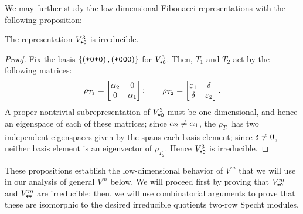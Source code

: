 \documentclass{amsart}
\begin{document}
We may further study the low-dimensional Fibonacci representations with the following proposition:
\begin{proposition}\label{3 irreducibility}
  The representation \emph{$V^3_{\texttt{*}\texttt{0}}$} is irreducible.
\end{proposition}
\begin{proof}
  Fix the basis $\left\{ \left( \texttt{*}\texttt{0}\texttt{*}\texttt{0} \right), \left( \texttt{*}\texttt{0}\texttt{0}\texttt{0} \right) \right\}$ for $V^3_{\texttt{*}\texttt{0}}$.
  Then, $T_1$ and $T_2$ act by the following matrices:
\[
  \rho_{T_1} = \begin{bmatrix}
    \alpha_2 & 0\\
    0 & \alpha_1
  \end{bmatrix}; \hspace{20pt}
  \rho_{T_2} = \begin{bmatrix}
    \varepsilon_1 & \delta\\
    \delta & \varepsilon_2
  \end{bmatrix}.
\]
  A proper nontrivial subrepresentation of $V_{\texttt{*}\texttt{0}}^3$ must be one-dimensional, and hence an eigenspace of each of these matrices;
  since $\alpha_2 \neq \alpha_1$, the $\rho_{T_1}$ has two independent eigenspaces given by the spans each basis element; since $\delta \neq 0$, neither basis element is an eigenvector of $\rho_{T_2}$.
  Hence $V^3_{\texttt{*}\texttt{0}}$ is irreducible.
\end{proof}

These propositions establish the low-dimensional behavior of $V^m$ that we will use in our analysis of general $V^m$ below.
We will proceed first by proving that $V^m_{\texttt{*}\texttt{0}}$ and $V^m_{\texttt{*}\texttt{*}}$ are irreducible;
then, we will use combinatorial arguments to prove that these are isomorphic to the desired irreducible quotients two-row Specht modules.
\end{document}
